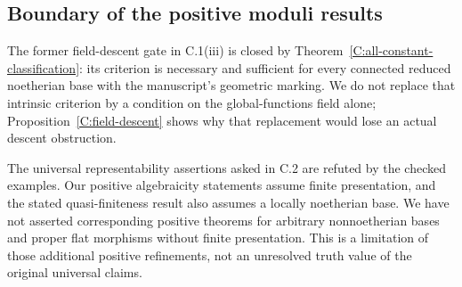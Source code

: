 \subsection{Boundary of the positive moduli results}

The former field-descent gate in C.1(iii) is closed by
Theorem~\ref{C:all-constant-classification}: its criterion is necessary
and sufficient for every connected reduced noetherian base with the
manuscript's geometric marking.  We do not replace that intrinsic
criterion by a condition on the global-functions field alone;
Proposition~\ref{C:field-descent} shows why that replacement would
lose an actual descent obstruction.

The universal representability assertions asked in C.2 are refuted by
the checked examples.  Our positive algebraicity statements assume
finite presentation, and the stated quasi-finiteness result also
assumes a locally noetherian base.  We have not asserted corresponding
positive theorems for arbitrary nonnoetherian bases and proper flat
morphisms without finite presentation.  This is a limitation of those
additional positive refinements, not an unresolved truth value of
the original universal claims.
